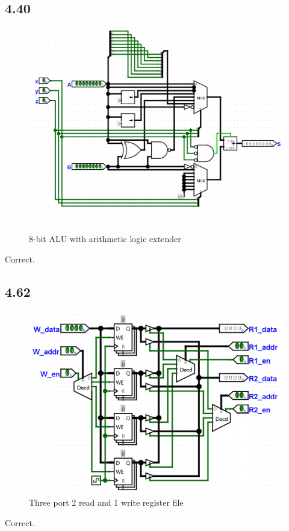 \documentclass{article}
\begin{document}
\subsection*{4.40}
\begin{figure}[H]
    \centering
    \includegraphics[width=0.9\linewidth]{./images/4.40.png}\
    \caption*{8-bit ALU with arithmetic logic extender}
\end{figure}

\textcolor{mygreen}{Correct.}

\subsection*{4.62}
\begin{figure}[H]
    \centering
    \includegraphics[width=0.8\linewidth]{./images/4.62.png}
    \caption*{Three port 2 read and 1 write register file}
\end{figure}

\textcolor{mygreen}{Correct.}
\end{document}
